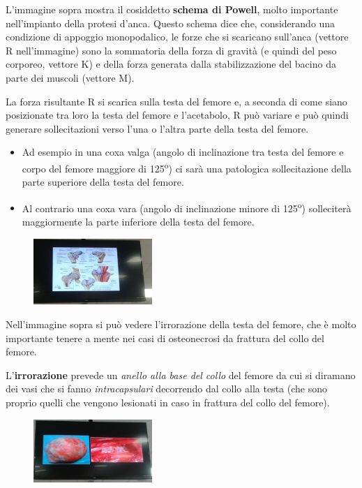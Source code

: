 L'immagine sopra mostra il cosiddetto \textbf{schema di Powell}, molto importante nell'impianto della protesi d'anca. Questo schema dice che, considerando una condizione di appoggio monopodalico, le forze che si scaricano sull'anca (vettore R nell'immagine) sono la sommatoria della forza di gravità (e quindi del peso corporeo, vettore K) e della forza generata dalla stabilizzazione del bacino da parte dei muscoli (vettore M).

La forza risultante R si scarica sulla testa del femore e, a seconda di come siano posizionate tra loro la testa del femore e l'acetabolo, R può variare e può quindi generare sollecitazioni verso l'una o l'altra parte della testa del femore.

\begin{itemize}
\item
  Ad esempio in una coxa valga (angolo di inclinazione tra testa del femore e corpo del femore maggiore di 125\textsuperscript{o}) ci sarà una patologica sollecitazione della parte superiore della testa del femore.
\item
  Al contrario una coxa vara (angolo di inclinazione minore di 125\textsuperscript{o}) solleciterà maggiormente la parte inferiore della testa del femore.
\end{itemize}

\begin{figure}[!ht]
\centering
\includegraphics[width=0.4\textwidth]{019/image5.jpeg}
\end{figure}

Nell'immagine sopra si può vedere l'irrorazione della testa del femore, che è molto importante tenere a mente nei casi di osteonecrosi da frattura del collo del femore.

L'\textbf{irrorazione} prevede un \emph{anello alla base del collo} del femore da cui si diramano dei vasi che si fanno \emph{intracapsulari} decorrendo dal collo alla testa (che sono proprio quelli che vengono lesionati in caso in frattura del collo del femore).

\begin{figure}[!ht]
\centering
\includegraphics[width=0.4\textwidth]{019/image6.jpeg}
\end{figure}

